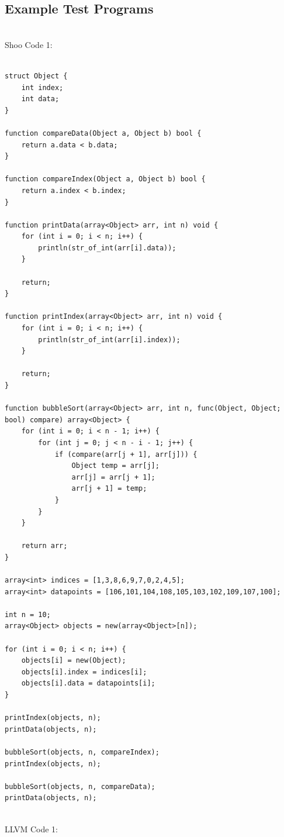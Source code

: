\documentclass[12pt]{article}
\begin{document}
\subsection{Example Test Programs}
\\
Shoo Code 1:\\
\\
\begin{mdframed}[hidealllines=true,backgroundcolor=blue!10]
\begin{lstlisting}
struct Object {
	int index;
	int data;
}

function compareData(Object a, Object b) bool {
    return a.data < b.data;
}

function compareIndex(Object a, Object b) bool {
    return a.index < b.index;
}

function printData(array<Object> arr, int n) void {
	for (int i = 0; i < n; i++) {
		println(str_of_int(arr[i].data));
	}
	
	return;
}

function printIndex(array<Object> arr, int n) void {
	for (int i = 0; i < n; i++) {
		println(str_of_int(arr[i].index));
	}
	
	return;
}

function bubbleSort(array<Object> arr, int n, func(Object, Object; bool) compare) array<Object> {
	for (int i = 0; i < n - 1; i++) {
		for (int j = 0; j < n - i - 1; j++) {
			if (compare(arr[j + 1], arr[j])) {
				Object temp = arr[j];
				arr[j] = arr[j + 1];
				arr[j + 1] = temp;
			}
		}
	}
	
	return arr;
}

array<int> indices = [1,3,8,6,9,7,0,2,4,5];
array<int> datapoints = [106,101,104,108,105,103,102,109,107,100];

int n = 10;
array<Object> objects = new(array<Object>[n]);

for (int i = 0; i < n; i++) {
	objects[i] = new(Object);
	objects[i].index = indices[i]; 
	objects[i].data = datapoints[i];
}

printIndex(objects, n);
printData(objects, n);

bubbleSort(objects, n, compareIndex);
printIndex(objects, n);

bubbleSort(objects, n, compareData);
printData(objects, n);

\end{lstlisting}
\end{mdframed}
\\
LLVM Code 1:\\
\\
\end{document}
